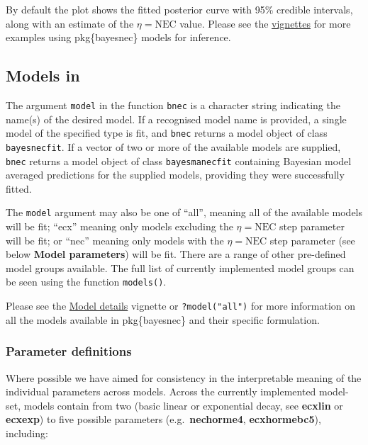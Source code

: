\documentclass[
]{jss}
\begin{document}
By default the plot shows the fitted posterior curve with 95\% credible
intervals, along with an estimate of the \(\eta = \text{NEC}\) value.
Please see the
\href{https://open-aims.github.io/bayesnec/articles/}{vignettes} for
more examples using pkg\{bayesnec\} models for inference.

\hypertarget{models-in}{%
\subsection{\texorpdfstring{Models in
}{Models in }}\label{models-in}}

The argument \texttt{model} in the function \texttt{bnec} is a character
string indicating the name(s) of the desired model. If a recognised
model name is provided, a single model of the specified type is fit, and
\texttt{bnec} returns a model object of class \texttt{bayesnecfit}. If a
vector of two or more of the available models are supplied,
\texttt{bnec} returns a model object of class \texttt{bayesmanecfit}
containing Bayesian model averaged predictions for the supplied models,
providing they were successfully fitted.

The \texttt{model} argument may also be one of ``all'', meaning all of
the available models will be fit; ``ecx'' meaning only models excluding
the \(\eta = \text{NEC}\) step parameter will be fit; or ``nec'' meaning
only models with the \(\eta = \text{NEC}\) step parameter (see below
\textbf{Model parameters}) will be fit. There are a range of other
pre-defined model groups available. The full list of currently
implemented model groups can be seen using the function
\texttt{models()}.

Please see the
\href{https://open-aims.github.io/bayesnec/articles/example2b.html}{Model
details} vignette or \texttt{?model("all")} for more information on all
the models available in pkg\{bayesnec\} and their specific formulation.

\hypertarget{parameter-definitions}{%
\subsubsection{Parameter definitions}\label{parameter-definitions}}

Where possible we have aimed for consistency in the interpretable
meaning of the individual parameters across models. Across the currently
implemented model-set, models contain from two (basic linear or
exponential decay, see \textbf{ecxlin} or \textbf{ecxexp}) to five
possible parameters (e.g.~\textbf{nechorme4}, \textbf{ecxhormebc5}),
including:
\end{document}
